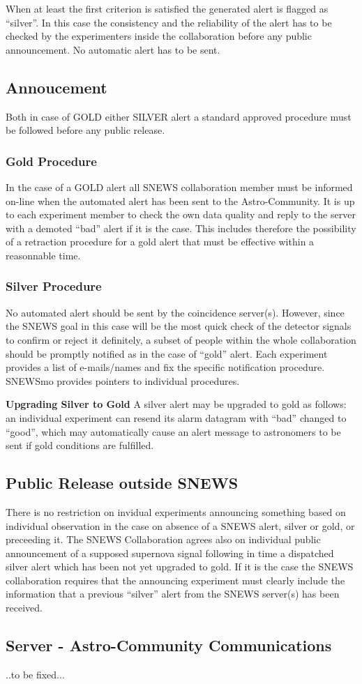 \documentclass{article}
\begin{document}
When at least the first criterion is satisfied the generated alert is
flagged as ``silver''. In this case the consistency and the reliability 
of the alert has to be checked by the experimenters inside the collaboration before any public announcement. No automatic alert has to be sent.


\subsection{Annoucement}
Both in case of GOLD either SILVER alert a standard approved procedure must 
be followed before any public release. 

\subsubsection{Gold Procedure}
In the case of a GOLD alert all SNEWS collaboration member must be informed
on-line when the automated alert has been sent to the Astro-Community. It is
up to each experiment member to check the own data quality and reply to the 
server with a demoted ``bad'' alert if it is the case.
This includes therefore the possibility of a retraction procedure for a gold 
alert that must be effective within a reasonnable time.

\subsubsection{Silver Procedure}
No automated alert should be sent by the coincidence server(s). However,
since the SNEWS goal in this case will be the most quick check of the detector signals to confirm or reject it definitely,
a subset of people within the whole collaboration should be promptly notified
as in the case of ``gold'' alert. 
Each experiment provides a list of e-mails/names and fix the
specific notification procedure. SNEWSmo provides pointers to individual procedures. 

\textbf{Upgrading Silver to Gold}
A silver alert may be upgraded to gold as follows:  an
individual experiment can resend its alarm datagram with ``bad''
changed to ``good'', which may automatically cause an alert message to
astronomers to be sent if gold conditions are fulfilled.  

\subsection{Public Release outside SNEWS}
There is no restriction on invidual experiments announcing
something based on individual observation in the case on absence
of a SNEWS alert, silver or gold, or preceeding it.
The SNEWS Collaboration agrees also on individual public announcement of a 
supposed supernova signal following in time a dispatched silver alert
which has been not  yet upgraded to gold. If it is the case the SNEWS 
collaboration requires that the announcing experiment must clearly include the 
information that a previous ``silver'' alert from the SNEWS server(s) has been 
received.
                                                                              
\subsection{Server - Astro-Community Communications}

..to be fixed...
\end{document}
